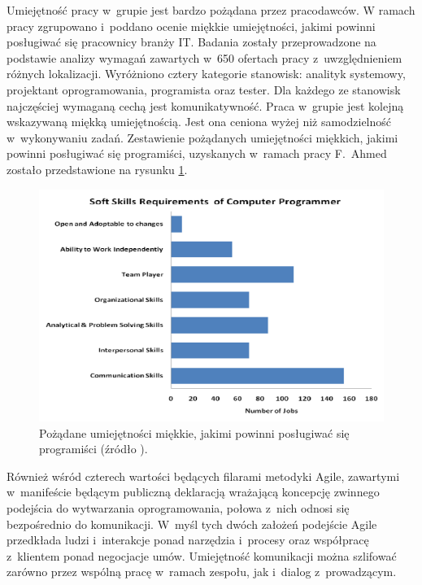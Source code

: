 Umiejętność pracy w~grupie jest bardzo pożądana przez pracodawców.
W ramach pracy \cite{soft-skills} zgrupowano i~poddano ocenie miękkie umiejętności, jakimi powinni posługiwać się pracownicy branży IT.
Badania zostały przeprowadzone na podstawie analizy wymagań zawartych w~650 ofertach pracy z~uwzględnieniem różnych lokalizacji.
Wyróżniono cztery kategorie stanowisk: analityk systemowy, projektant oprogramowania, programista oraz tester.
Dla każdego ze stanowisk najczęściej wymaganą cechą jest komunikatywność.
Praca w~grupie jest kolejną wskazywaną miękką umiejętnością.
Jest ona ceniona wyżej niż samodzielność w~wykonywaniu zadań.
Zestawienie pożądanych umiejętności miękkich, jakimi powinni posługiwać się programiści, uzyskanych w~ramach pracy F.~Ahmed zostało przedstawione na rysunku \ref{fig:soft-skills}.

\begin{figure}[h]
    \centering
    \includegraphics[width = 13cm]{chapter02/soft-skills.png}
    \caption{Pożądane umiejętności miękkie, jakimi powinni posługiwać się programiści (źródło \cite{soft-skills}).}
    \label{fig:soft-skills}
\end{figure}

Również wśród czterech wartości będących filarami metodyki Agile, zawartymi w~manifeście \cite{agile-manifesto} będącym publiczną deklaracją wrażającą koncepcję zwinnego podejścia do wytwarzania oprogramowania, połowa z~nich odnosi się bezpośrednio do komunikacji.
W~myśl tych dwóch założeń podejście Agile przedkłada ludzi i~interakcje ponad narzędzia i~procesy oraz współpracę z~klientem ponad negocjacje umów.
Umiejętność komunikacji można szlifować zarówno przez wspólną pracę w~ramach zespołu, jak i~dialog z~prowadzącym.

